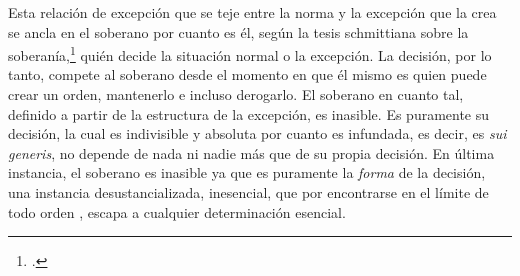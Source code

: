 Esta relación de excepción que se teje entre la norma y la excepción que la crea se ancla en el soberano por cuanto es él, según la tesis schmittiana sobre la soberanía,\footcite{@7096-SCHMITT1987} quién decide la situación normal o la excepción. La decisión, por lo tanto, compete al soberano desde el momento en que él mismo es quien puede crear un orden, mantenerlo e incluso derogarlo. El soberano en cuanto tal, definido a partir de la estructura de la excepción, es inasible. Es puramente su decisión, la cual es indivisible y absoluta  por cuanto es infundada, es decir, es \emph{sui generis}, no depende de nada ni nadie más que de su propia decisión. En última instancia, el soberano es inasible ya que es puramente la \emph{forma} de la decisión, una instancia desustancializada, inesencial, que por encontrarse en el límite de todo orden , escapa a cualquier determinación esencial.

